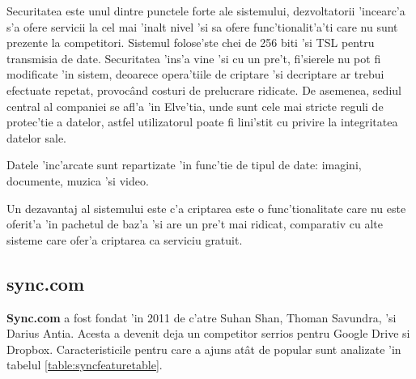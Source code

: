 \documentclass[12pt,a4paper,twoside]{report}
\begin{document}
Securitatea este unul dintre punctele forte ale sistemului, dezvoltatorii 'incearc'a s'a ofere servicii la cel mai 'inalt nivel 'si sa ofere func'tionalit'a'ti care nu sunt prezente la competitori. Sistemul folose'ste chei de 256 biti 'si TSL pentru transmisia de date. Securitatea 'ins'a vine 'si cu un pre't, fi'sierele nu pot fi modificate 'in sistem, deoarece opera'tiile de criptare 'si decriptare ar trebui efectuate repetat, provocând costuri de prelucrare ridicate. De asemenea, sediul central al companiei se afl'a 'in Elve'tia, unde sunt cele mai stricte reguli de protec'tie a datelor, astfel utilizatorul poate fi lini'stit cu privire la integritatea datelor sale.

Datele 'inc'arcate sunt repartizate 'in func'tie de tipul de date: imagini, documente, muzica 'si video.

Un dezavantaj al sistemului este c'a criptarea este o func'tionalitate care nu este oferit'a 'in pachetul de baz'a 'si are un pre't mai ridicat, comparativ cu  alte sisteme care ofer'a criptarea ca serviciu gratuit.



\subsection{sync.com}
\textbf{Sync.com} a fost fondat 'in 2011 de c'atre Suhan Shan, Thoman Savundra, 'si Darius Antia. Acesta a devenit deja un competitor serrios pentru Google Drive si Dropbox. Caracteristicile pentru care a ajuns atât de popular sunt analizate 'in tabelul \ref{table:syncfeaturetable}.
\end{document}
